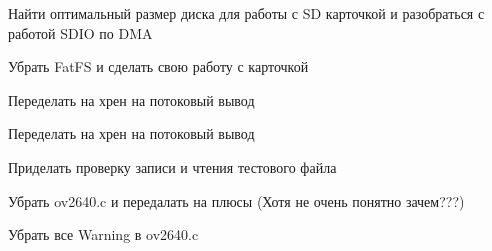 
\begin{DoxyRefList}
\item[\label{todo__todo000003}%
\Hypertarget{todo__todo000003}%
Член \hyperlink{group___xD0_x9F_xD0_xB5_xD1_x80_xD0_xB5_xD1_x87_xD0_xB8_xD1_x81_xD0_xBB_xD0_xB5_xD0_xBD_xD0_xB8_xD1_x8F_ga290e8080c661e52c2f685fd4af148acf}{app\+:\+:app\+State} ]Найти оптимальный размер диска для работы с SD карточкой и разобраться с работой S\+D\+IO по D\+MA 

Убрать Fat\+FS и сделать свою работу с карточкой  
\item[\label{todo__todo000002}%
\Hypertarget{todo__todo000002}%
Член \hyperlink{classapp_1_1_t_application_a0c44fe0e56bc2d85720155880c9b54a6}{app\+:\+:T\+Application\+:\+:debug\+Mesage} (const uint8\+\_\+t $\ast$, const std\+::size\+\_\+t)]Переделать на хрен на потоковый вывод  
\item[\label{todo__todo000001}%
\Hypertarget{todo__todo000001}%
Член \hyperlink{classapp_1_1_t_application_a2ac87a63360e7974afe2249f7b7e54cd}{app\+:\+:T\+Application\+:\+:debug\+Mesage} (const std\+::string \&)]Переделать на хрен на потоковый вывод  
\item[\label{todo__todo000004}%
\Hypertarget{todo__todo000004}%
Член \hyperlink{classunit_1_1_t_file_system_a0737b50d219570ae2e11ea17a32cc85c}{unit\+:\+:T\+File\+System\+:\+:check} ()]Приделать проверку записи и чтения тестового файла  
\item[\label{todo__todo000005}%
\Hypertarget{todo__todo000005}%
Класс \hyperlink{classunit_1_1_t_photo}{unit\+:\+:T\+Photo} ]Убрать ov2640.\+c и передалать на плюсы (Хотя не очень понятно зачем???) 

Убрать все Warning в ov2640.\+c 
\end{DoxyRefList}